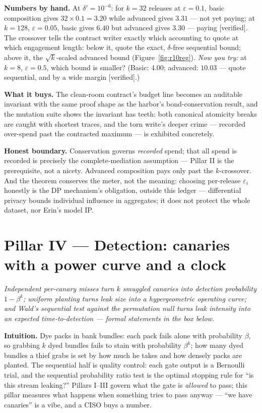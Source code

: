 \documentclass[11pt,a4paper]{article}
\newcommand{\onebreath}[1]{\begin{center}\emph{#1}\end{center}}
\begin{document}
\textbf{Numbers by hand.} At $\delta'=10^{-6}$: for $k{=}32$ releases at $\varepsilon{=}0.1$, basic composition gives $32\times
0.1=3.20$ while advanced gives $3.31$ --- not yet paying; at $k{=}128$, $\varepsilon{=}0.05$, basic gives $6.40$ but advanced
gives $3.30$ --- paying [verified]. The crossover tells the contract writer exactly which accounting to quote at which engagement
length: below it, quote the exact, $\delta$-free sequential bound; above it, the $\sqrt{k}$-scaled advanced bound
(Figure~\ref{fig:r10reg}).
\emph{Now you try:} at $k{=}8$, $\varepsilon{=}0.5$, which bound is smaller? (Basic: $4.00$; advanced: $10.03$ --- quote sequential, and by a
wide margin [verified].)



\textbf{What it buys.} The clean-room contract's budget line becomes an auditable invariant with the same proof shape as the
harbor's bond-conservation result, and the mutation suite shows the invariant has teeth: both canonical atomicity breaks are
caught with shortest traces, and the torn write's deeper crime --- recorded over-spend past the contracted maximum --- is
exhibited concretely.

\begin{boundary}
\textbf{Honest boundary.} Conservation governs \emph{recorded} spend; that all spend is recorded is precisely the
complete-mediation assumption --- Pillar II is the prerequisite, not a nicety. Advanced composition pays only past the
$k$-crossover. And the theorem conserves the meter, not the meaning: choosing per-release $\varepsilon_i$ honestly is the DP
mechanism's obligation, outside this ledger --- differential privacy bounds individual influence in aggregates; it does not
protect the whole dataset, nor Erin's model IP.
\end{boundary}

\section{Pillar IV --- Detection: canaries with a power curve and a clock}\label{sec:p4}

\onebreath{Independent per-canary misses turn $k$ smuggled canaries into detection probability
$1-\beta^k$; uniform planting turns leak size into a hypergeometric operating curve; and Wald's sequential test against the
permutation null turns leak intensity into an expected time-to-detection --- formal statements in the box below.}

\textbf{Intuition.} Dye packs in bank bundles: each pack fails alone with probability $\beta$, so grabbing $k$ dyed bundles fails
to stain with probability $\beta^k$; how many dyed bundles a thief grabs is set by how much he takes and how densely packs are
planted. The sequential half is quality control: each gate output is a Bernoulli trial, and the sequential probability ratio test
is the optimal stopping rule for ``is this stream leaking?'' Pillars I--III govern what the gate is \emph{allowed} to pass; this
pillar measures what happens when something tries to pass anyway --- ``we have canaries'' is a vibe, and a CISO buys a number.
\end{document}
